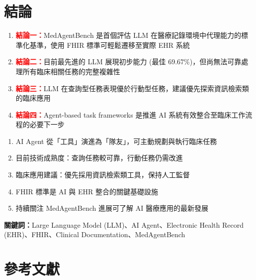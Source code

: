 \documentclass[12pt,a4paper]{article}
\begin{document}
\section{結論}

\begin{enumerate}
    \item \textcolor{red}{\textbf{結論一：}}MedAgentBench 是首個評估 LLM 在醫療記錄環境中代理能力的標準化基準，使用 FHIR 標準可輕鬆遷移至實際 EHR 系統

    \item \textcolor{red}{\textbf{結論二：}}目前最先進的 LLM 展現初步能力 (最佳 69.67\%)，但尚無法可靠處理所有臨床相關任務的完整複雜性

    \item \textcolor{red}{\textbf{結論三：}}LLM 在查詢型任務表現優於行動型任務，建議優先探索資訊檢索類的臨床應用

    \item \textcolor{red}{\textbf{結論四：}}Agent-based task frameworks 是推進 AI 系統有效整合至臨床工作流程的必要下一步
\end{enumerate}

\vspace{0.5cm}

\begin{tcolorbox}[colback=highlight_yellow,colframe=emergency_red,title=\textbf{Take-Home Message}]
\begin{enumerate}
    \item AI Agent 從「工具」演進為「隊友」，可主動規劃與執行臨床任務
    \item 目前技術成熟度：查詢任務較可靠，行動任務仍需改進
    \item 臨床應用建議：優先採用資訊檢索類工具，保持人工監督
    \item FHIR 標準是 AI 與 EHR 整合的關鍵基礎設施
    \item 持續關注 MedAgentBench 進展可了解 AI 醫療應用的最新發展
\end{enumerate}
\end{tcolorbox}

\vspace{0.5cm}
\textbf{關鍵詞：}Large Language Model (LLM)、AI Agent、Electronic Health Record (EHR)、FHIR、Clinical Documentation、MedAgentBench

\section{參考文獻}
\end{document}
